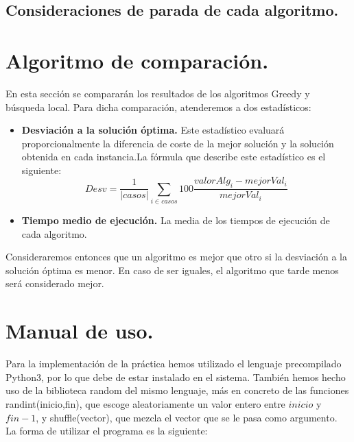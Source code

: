 \newpage

\subsection{Consideraciones de parada de cada algoritmo.}



\newpage

\section{Algoritmo de comparación.}
En esta sección se compararán los resultados de los algoritmos Greedy y búsqueda local. Para dicha comparación, atenderemos a dos estadísticos:\\

\begin{itemize}
	\item \textbf{Desviación a la solución óptima.} Este estadístico evaluará proporcionalmente la diferencia de coste de la mejor solución y la solución obtenida en cada instancia.La fórmula que describe este estadístico es el siguiente:
	\[Desv = \dfrac{1}{ \left| casos\right|}\sum_{i \in casos}100\dfrac{valorAlg_i - mejorVal_i}{mejorVal_i} \]
	
	\item \textbf{Tiempo medio de ejecución.} La media de los tiempos de ejecución de cada algoritmo.
\end{itemize}

Consideraremos entonces que un algoritmo es mejor que otro si la desviación a la solución óptima es menor. En caso de ser iguales, el algoritmo que tarde menos será considerado mejor.

\newpage

\section{Manual de uso.}

Para la implementación de la práctica hemos utilizado el lenguaje precompilado Python3, por lo que debe de estar instalado en el sistema. También hemos hecho uso de la biblioteca random del mismo lenguaje, más en concreto de las funciones randint(inicio,fin), que escoge aleatoriamente un valor entero entre  $inicio$ y $fin-1$, y shuffle(vector), que mezcla el vector que se le pasa como argumento.\\

La forma de utilizar el programa es la siguiente:\\


